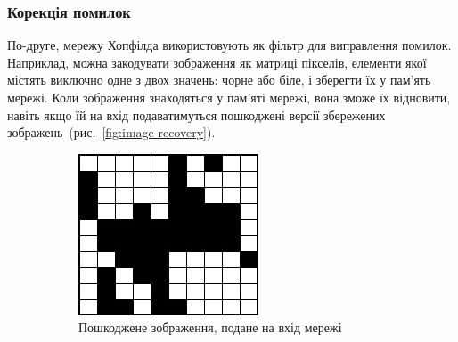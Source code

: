\documentclass[
  a4paper,
  oneside,
  BCOR = 10mm,
  DIV = 12,
  12pt,
  headings = normal,
]{scrartcl}
\newlength{\gridunitwidth}
\begin{document}
      \subsubsection{Корекція помилок}
        По-друге, мережу Хопфілда використовують як фільтр для виправлення помилок. Наприклад, можна закодувати зображення як матриці пікселів, елементи якої містять виключно одне з двох значень: чорне або біле, і зберегти їх у пам'ять мережі. Коли зображення знаходяться у пам'яті мережі, вона зможе їх відновити, навіть якщо їй на вхід подаватимуться пошкоджені версії збережених зображень~(рис.~\ref{fig:image-recovery}).

        \begin{figure}[!htbp]
          \begin{subfigure}[t]{6\gridunitwidth - 0.5\gridunitwidth}
            \includegraphics[width = \columnwidth]{./assets/y04s02-ai-homework-01-s02-report-p02.jpg}
            \caption{Пошкоджене зображення, подане на вхід мережі}
            \label{subfig:image-recovery-01}
          \end{subfigure}%
          \hspace{1\gridunitwidth}%
          \begin{subfigure}[t]{6\gridunitwidth - 0.5\gridunitwidth}

\end{subfigure}
\end{figure}
\end{document}
